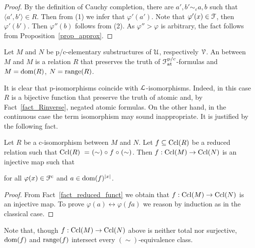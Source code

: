 \documentclass{amsproc}
\renewcommand*{\emph}[1]{%
   \smash{\tikz[baseline]\node[rectangle, fill=teal!25, rounded corners, inner xsep=0.5ex, inner ysep=0.2ex, anchor=base, minimum height = 2.7ex]{\strut #1};}}
\begin{document}
{\begin{proof}


  By the definition of Cauchy completion, there are $a',b'\sim_\varepsilon a,b$ such that $\langle a',b'\rangle\in R$.
  Then from (1) we infer that $\varphi'(a')$.
  Note that $\varphi'(x)\in{\EuScript F}$, then $\varphi'(b')$. 
  Then $\varphi''(b)$ follows from (2).
  As $\varphi''>\varphi$ is arbitrary, the fact follows from Proposition~\ref{prop_approx}.
\end{proof}

\begin{definition}\label{def_ciso}
  Let $M$ and $N$ be p/c-elementary substructures of ${\EuScript U}$, respectively ${\EuScript V}$.
  An \emph{p/c-isomorphism\/} between $M$ and $M$ is a relation $R$ that preserves the truth of ${\EuScript F}^{\rm p/c}_{\rm at}$-formulas and $M={\rm dom}(R)$,  $N={\rm range}(R)$.
\end{definition}

 It is clear that p-isomorphisms coincide with ${\EuScript L}$-isomorphisms. 
 Indeed, in this case $R$ is a bijective function that preserve the truth of atomic and, by Fact~\ref{fact_Rinverse}, negated atomic formulas.
 On the other hand, in the continuous case the term isomorphism may sound inappropriate.
 It is justified by the following fact.

\begin{fact}\label{fact_c_iso}
  Let $R$ be a c-isomorphism between $M$ and $N$.
  Let $f\subseteq{\rm Ccl}(R)$ be a reduced relation such that ${\rm Ccl}(R)\ =\ \mathrel{(\sim)}\circ \mathrel{f}\circ\mathrel{(\sim)}$.
  Then $f:{\rm Ccl}(M)\rightarrow{\rm Ccl}(N)$ is an injective map such that 
  
  \hfill for all $\varphi(x)\in{\EuScript F}^{\rm c}$ and $a\in{\rm dom}(f)^{|x|}$.
\end{fact}

\begin{proof}
  From Fact~\ref{fact_reduced_funct} we obtain that $f:{\rm Ccl}(M)\rightarrow{\rm Ccl}(N)$ is an injective map.
  To prove $\varphi(a)\leftrightarrow\varphi(fa)$ we reason by induction as in the classical case.
\end{proof}

Note that, though $f:{\rm Ccl}(M)\rightarrow{\rm Ccl}(N)$ above is neither total nor surjective, ${\rm dom}(f)$ and ${\rm range}(f)$ intersect every $(\sim)$-equivalence class.

}
\end{document}

